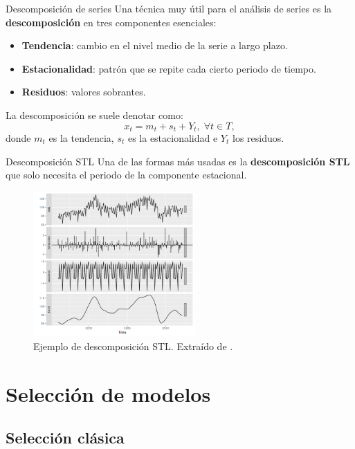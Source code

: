 \documentclass[spanish]{beamer}
\begin{document}
\begin{frame}{Descomposición de series}
  Una técnica muy útil para el análisis de series es la \textbf{descomposición} en tres componentes esenciales:
  \pause
  \begin{itemize}[<+->]
    \item \textbf{Tendencia}: cambio en el nivel medio de la serie a largo plazo.
    \item \textbf{Estacionalidad}: patrón que se repite cada cierto periodo de tiempo.
    \item \textbf{Residuos}: valores sobrantes.
  \end{itemize}
  \pause[\thebeamerpauses]
  La descomposición se suele denotar como: $$x_t = m_t + s_t + Y_t, \; \forall t \in T,$$
  donde $m_t$ es la tendencia, $s_t$ es la estacionalidad e $Y_t$ los residuos.
\end{frame}

\begin{frame}{Descomposición STL}
  Una de las formas más usadas es la \textbf{descomposición STL} que solo necesita el periodo de la componente estacional.

  \begin{figure}
    \centering
    \includegraphics[width=0.55\textwidth]{img/stl-decomposition}
    \caption{Ejemplo de descomposición STL. Extraído de \cite{timeseries}.}
  \end{figure}
\end{frame}

\section{Selección de modelos}

\subsection{Selección clásica}
\end{document}
